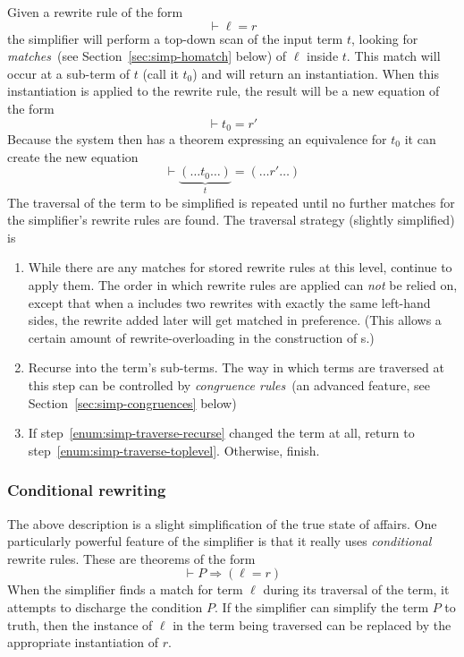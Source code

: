 Given a rewrite rule of the form \[
\vdash \ell = r
\]
the simplifier will perform a top-down scan of the input term $t$,
looking for \emph{matches}~(see Section~\ref{sec:simp-homatch} below)
of $\ell$ inside $t$.  This match will occur at a sub-term of $t$
(call it $t_0$) and will return an instantiation.  When this
instantiation is applied to the rewrite rule, the result will be a new
equation of the form \[
\vdash t_0 = r'
\]
Because the system then has a theorem expressing an equivalence for
$t_0$ it can create the new equation \[
  \vdash \underbrace{(\dots t_0\dots)}_t = (\dots r' \dots)
\]
The traversal of the term to be simplified is repeated until no
further matches for the simplifier's rewrite rules are found.  The
traversal strategy (slightly simplified) is
\begin{enumerate}
\item \label{enum:simp-traverse-toplevel}%
  While there are any matches for stored rewrite rules at this level,
  continue to apply them.  The order in which rewrite rules are
  applied can \emph{not} be relied on, except that when a \simpset{}
  includes two rewrites with exactly the same left-hand sides, the
  rewrite added later will get matched in preference.  (This allows a
  certain amount of rewrite-overloading in the construction of
  \simpset{}s.)
\item \label{enum:simp-traverse-recurse}%
  Recurse into the term's sub-terms.  The way in which terms are
  traversed at this step can be controlled by \emph{congruence
    rules}~(an advanced feature, see Section~\ref{sec:simp-congruences}
  below)
\item If step~\ref{enum:simp-traverse-recurse} changed the term at
  all, return to step~\ref{enum:simp-traverse-toplevel}.  Otherwise,
  finish.
\end{enumerate}

\subsubsection{Conditional rewriting}

The above description is a slight simplification of the true state of
affairs.  One particularly powerful feature of the simplifier is that
it really uses \emph{conditional} rewrite rules.  These are theorems
of the form
\[
\vdash P \Rightarrow (\ell = r)
\]
When the simplifier finds a match for term $\ell$ during its traversal
of the term, it attempts to discharge the condition $P$.  If the
simplifier can simplify the term $P$ to truth, then the instance of
$\ell$ in the term being traversed can be replaced by the appropriate
instantiation of $r$.

